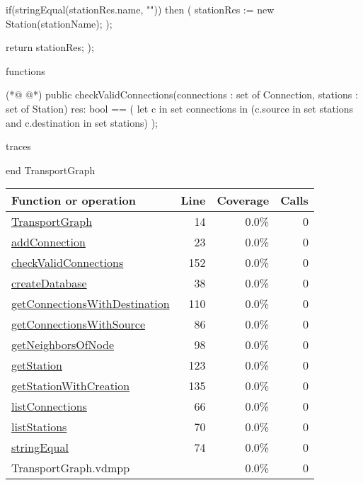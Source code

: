 \begin{vdmpp}[breaklines=true]
  if(stringEqual(stationRes.name, "")) then (
   stationRes := new Station(stationName);
  );
  
  return stationRes;
 );
 
functions

(*@
\label{checkValidConnections:152}
@*)
 public checkValidConnections(connections : set of Connection, stations : set of Station) res: bool ==
 (
  let c in set connections
  in (c.source in set stations and c.destination in set stations)
 );

traces

end TransportGraph
\end{vdmpp}
\bigskip
\begin{longtable}{|l|r|r|r|}
\hline
Function or operation & Line & Coverage & Calls \\
\hline
\hline
\hyperref[TransportGraph:14]{TransportGraph} & 14&0.0\% & 0 \\
\hline
\hyperref[addConnection:23]{addConnection} & 23&0.0\% & 0 \\
\hline
\hyperref[checkValidConnections:152]{checkValidConnections} & 152&0.0\% & 0 \\
\hline
\hyperref[createDatabase:38]{createDatabase} & 38&0.0\% & 0 \\
\hline
\hyperref[getConnectionsWithDestination:110]{getConnectionsWithDestination} & 110&0.0\% & 0 \\
\hline
\hyperref[getConnectionsWithSource:86]{getConnectionsWithSource} & 86&0.0\% & 0 \\
\hline
\hyperref[getNeighborsOfNode:98]{getNeighborsOfNode} & 98&0.0\% & 0 \\
\hline
\hyperref[getStation:123]{getStation} & 123&0.0\% & 0 \\
\hline
\hyperref[getStationWithCreation:135]{getStationWithCreation} & 135&0.0\% & 0 \\
\hline
\hyperref[listConnections:66]{listConnections} & 66&0.0\% & 0 \\
\hline
\hyperref[listStations:70]{listStations} & 70&0.0\% & 0 \\
\hline
\hyperref[stringEqual:74]{stringEqual} & 74&0.0\% & 0 \\
\hline
\hline
TransportGraph.vdmpp & & 0.0\% & 0 \\
\hline
\end{longtable}


